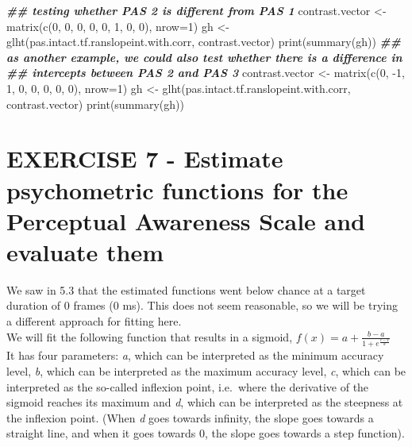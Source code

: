 \documentclass[
]{article}
\newenvironment{Shaded}{\begin{snugshade}}{\end{snugshade}}
\newcommand{\AttributeTok}[1]{\textcolor[rgb]{0.77,0.63,0.00}{#1}}
\newcommand{\DecValTok}[1]{\textcolor[rgb]{0.00,0.00,0.81}{#1}}
\newcommand{\DocumentationTok}[1]{\textcolor[rgb]{0.56,0.35,0.01}{\textbf{\textit{#1}}}}
\newcommand{\FunctionTok}[1]{\textcolor[rgb]{0.00,0.00,0.00}{#1}}
\newcommand{\NormalTok}[1]{#1}
\newcommand{\OtherTok}[1]{\textcolor[rgb]{0.56,0.35,0.01}{#1}}
\newcommand{\SpecialCharTok}[1]{\textcolor[rgb]{0.00,0.00,0.00}{#1}}
\begin{document}
\begin{Shaded}
\begin{Highlighting}[]
\DocumentationTok{\#\# testing whether PAS 2 is different from PAS 1}
\NormalTok{contrast.vector }\OtherTok{\textless{}{-}} \FunctionTok{matrix}\NormalTok{(}\FunctionTok{c}\NormalTok{(}\DecValTok{0}\NormalTok{, }\DecValTok{0}\NormalTok{, }\DecValTok{0}\NormalTok{, }\DecValTok{0}\NormalTok{, }\DecValTok{0}\NormalTok{, }\DecValTok{1}\NormalTok{, }\DecValTok{0}\NormalTok{, }\DecValTok{0}\NormalTok{), }\AttributeTok{nrow=}\DecValTok{1}\NormalTok{)}
\NormalTok{gh }\OtherTok{\textless{}{-}} \FunctionTok{glht}\NormalTok{(pas.intact.tf.ranslopeint.with.corr, contrast.vector)}
\FunctionTok{print}\NormalTok{(}\FunctionTok{summary}\NormalTok{(gh))}
\DocumentationTok{\#\# as another example, we could also test whether there is a difference in}
\DocumentationTok{\#\# intercepts between PAS 2 and PAS 3}
\NormalTok{contrast.vector }\OtherTok{\textless{}{-}} \FunctionTok{matrix}\NormalTok{(}\FunctionTok{c}\NormalTok{(}\DecValTok{0}\NormalTok{, }\SpecialCharTok{{-}}\DecValTok{1}\NormalTok{, }\DecValTok{1}\NormalTok{, }\DecValTok{0}\NormalTok{, }\DecValTok{0}\NormalTok{, }\DecValTok{0}\NormalTok{, }\DecValTok{0}\NormalTok{, }\DecValTok{0}\NormalTok{), }\AttributeTok{nrow=}\DecValTok{1}\NormalTok{)}
\NormalTok{gh }\OtherTok{\textless{}{-}} \FunctionTok{glht}\NormalTok{(pas.intact.tf.ranslopeint.with.corr, contrast.vector)}
\FunctionTok{print}\NormalTok{(}\FunctionTok{summary}\NormalTok{(gh))}
\end{Highlighting}
\end{Shaded}

\hypertarget{exercise-7---estimate-psychometric-functions-for-the-perceptual-awareness-scale-and-evaluate-them}{%
\section{EXERCISE 7 - Estimate psychometric functions for the Perceptual
Awareness Scale and evaluate
them}\label{exercise-7---estimate-psychometric-functions-for-the-perceptual-awareness-scale-and-evaluate-them}}

We saw in 5.3 that the estimated functions went below chance at a target
duration of 0 frames (0 ms). This does not seem reasonable, so we will
be trying a different approach for fitting here.\\
We will fit the following function that results in a sigmoid,
\(f(x) = a + \frac {b - a} {1 + e^{\frac {c-x} {d}}}\)\\
It has four parameters: \emph{a}, which can be interpreted as the
minimum accuracy level, \emph{b}, which can be interpreted as the
maximum accuracy level, \emph{c}, which can be interpreted as the
so-called inflexion point, i.e.~where the derivative of the sigmoid
reaches its maximum and \emph{d}, which can be interpreted as the
steepness at the inflexion point. (When \emph{d} goes towards infinity,
the slope goes towards a straight line, and when it goes towards 0, the
slope goes towards a step function).
\end{document}
